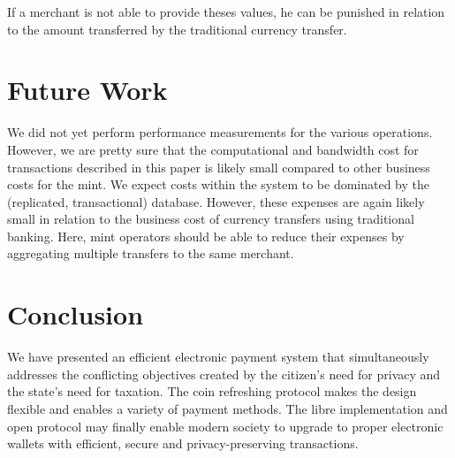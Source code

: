 \documentclass{llncs}
\begin{document}
If a merchant is not able to provide theses values, he can be punished
in relation to the amount transferred by the traditional currency
transfer.


\section{Future Work}


We did not yet perform performance measurements for the various
operations.  However, we are pretty sure that the computational and
bandwidth cost for transactions described in this paper is likely
small compared to other business costs for the mint.  We expect costs
within the system to be dominated by the (replicated, transactional)
database.  However, these expenses are again likely small in relation
to the business cost of currency transfers using traditional banking.
Here, mint operators should be able to reduce their expenses by
aggregating multiple transfers to the same merchant.


\section{Conclusion}

We have presented an efficient electronic payment system that
simultaneously addresses the conflicting objectives created by the
citizen's need for privacy and the state's need for taxation.  The
coin refreshing protocol makes the design flexible and enables a
variety of payment methods.  The libre implementation and open
protocol may finally enable modern society to upgrade to proper
electronic wallets with efficient, secure and privacy-preserving
transactions.



\end{document}
